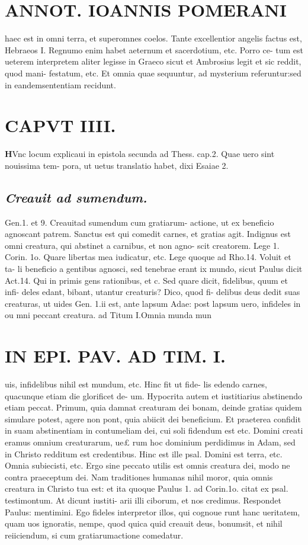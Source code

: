 \documentclass{article}
\begin{document}
\begin{pages}
\section*{ANNOT. IOANNIS POMERANI }\pstart haec est in omni terra, et superomnes coelos. Tante excellentior angelis factus est, Hebraeos I. Regnumo enim habet aeternum et sacerdotium, etc. Porro ce- tum est ueterem interpretem aliter legisse in Graeco sicut et Ambrosius legit et sic reddit, quod mani- festatum, etc. Et omnia quae sequuntur, ad mysterium referuntur:sed in eandemsententiam recidunt.  \pend
\endnumbering\beginnumbering\section{CAPVT IIII.}\pstart \huge\textbf{H}\normalsize Vnc locum explicaui in epistola secunda ad Thess. cap.2. Quae uero sint nouissima tem- pora, ut uetus translatio habet, dixi Esaiae 2.  \pend
{}
{}
\subsection*{\textit{Creauit ad sumendum. }}\pstart Gen.1. et 9. Creauitad sumendum cum gratiarum- actione, ut ex beneficio agnoscant patrem. Sanctus est qui comedit carnes, et gratias agit. Indignus est omni creatura, qui abstinet a carnibus, et non agno- scit creatorem. Lege 1. Corin. 1o. Quare libertas mea iudicatur, etc. Lege quoque ad Rho.14. Voluit et ta- li beneficio a gentibus agnosci, sed tenebrae erant ix mundo, sicut Paulus dicit Act.14. Qui in primis gens rationibus, et c. Sed quare dicit, fidelibus, quum et infi- deles edant, bibant, utantur creaturis? Dico, quod fi- delibus deus dedit suas creaturas, ut uides Gen. 1.ii est, ante lapsum Adae: post lapsum uero, infideles in ou mni peccant creatura. ad Titum I.Omnia munda mun  \pend
\section*{IN EPI. PAV. AD TIM. I. }
\marginpar{[ p.90 ]}\pstart uis, infidelibus nihil est mundum, etc. Hinc fit ut fide- lis edendo carnes, quacunque etiam die glorificet de- um. Hypocrita autem et iustitiarius abstinendo etiam peccat. Primum, quia damnat creaturam dei bonam, deinde gratias quidem simulare potest, agere non pont, quia abiicit dei beneficium. Et praeterea confidit in suam abstinentiam in contumeliam dei, cui soli fidendum est etc. Domini creati eramus omnium creaturarum, ue£ rum hoc dominium perdidimus in Adam, sed in Christo redditum est credentibus. Hinc est ille psal. Domini est terra, etc. Omnia subiecisti, etc. Ergo sine peccato utilis est omnis creatura dei, modo ne contra praeceptum dei. Nam traditiones humanas nihil moror, quia omnis creatura in Christo tua est: et ita quoque Paulus 1. ad Corin.1o. citat ex psal. testimontum. At dicunt iustiti- arii illi ciborum, et nos credimus. Respondet Paulus: mentimini. Ego fideles interpretor illos, qui cognoue runt hanc ueritatem, quam uos ignoratis, nempe, quod quica quid creauit deus, bonumsit, et nihil reiiciendum, si cum gratiarumactione comedatur.  \pend
{}
{}

\end{pages}
\end{document}

